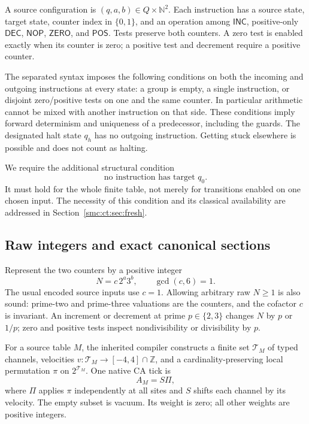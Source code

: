 \documentclass[11pt,letterpaper]{article}
\numberwithin{equation}{section}
\theoremstyle{definition}
\theoremstyle{remark}
\newcommand{\Z}{\mathbb Z}
\newcommand{\NN}{\mathbb N}
\newcommand{\INC}{\mathsf{INC}}\newcommand{\DEC}{\mathsf{DEC}}\newcommand{\NOP}{\mathsf{NOP}}\newcommand{\ZERO}{\mathsf{ZERO}}\newcommand{\POS}{\mathsf{POS}}
\begin{document}
A source configuration is $(q,a,b)\in Q\times\NN^2$. Each instruction has a source state, target state, counter index in $\{0,1\}$, and an operation among $\INC$, positive-only $\DEC$, $\NOP$, $\ZERO$, and $\POS$. Tests preserve both counters. A zero test is enabled exactly when its counter is zero; a positive test and decrement require a positive counter.

The separated syntax imposes the following conditions on both the incoming and outgoing instructions at every state: a group is empty, a single instruction, or disjoint zero/positive tests on one and the same counter. In particular arithmetic cannot be mixed with another instruction on that side. These conditions imply forward determinism and uniqueness of a predecessor, including the guards. The designated halt state $q_h$ has no outgoing instruction. Getting stuck elsewhere is possible and does not count as halting.

We require the additional structural condition
\begin{equation}\label{smc:ct:eq:fresh}
\text{no instruction has target }q_0.
\end{equation}
It must hold for the whole finite table, not merely for transitions enabled on one chosen input. The necessity of this condition and its classical availability are addressed in Section~\ref{smc:ct:sec:fresh}.

\subsection{Raw integers and exact canonical sections}

Represent the two counters by a positive integer
\begin{equation}\label{smc:ct:eq:raw}
N=c\,2^a3^b,\qquad \gcd(c,6)=1.
\end{equation}
The usual encoded source inputs use $c=1$. Allowing arbitrary raw $N\ge1$ is also sound: prime-two and prime-three valuations are the counters, and the cofactor $c$ is invariant. An increment or decrement at prime $p\in\{2,3\}$ changes $N$ by $p$ or $1/p$; zero and positive tests inspect nondivisibility or divisibility by $p$.

For a source table $M$, the inherited compiler constructs a finite set $\mathcal T_M$ of typed channels, velocities $v:\mathcal T_M\to[-4,4]\cap\Z$, and a cardinality-preserving local permutation $\pi$ on $2^{\mathcal T_M}$. One native CA tick is
\begin{equation}\label{smc:ct:eq:ca}
A_M=S\Pi,
\end{equation}
where $\Pi$ applies $\pi$ independently at all sites and $S$ shifts each channel by its velocity. The empty subset is vacuum. Its weight is zero; all other weights are positive integers.
\end{document}
